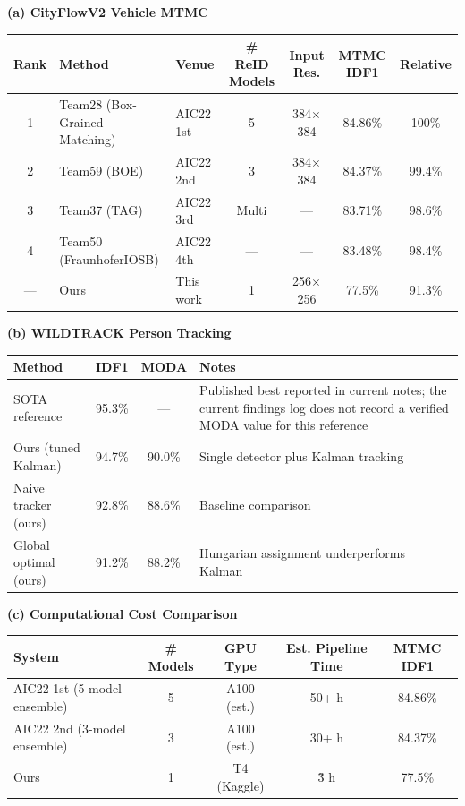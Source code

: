 \begingroup
\scriptsize
\setlength{\tabcolsep}{4pt}

\begin{minipage}{\textwidth}
\textbf{(a) CityFlowV2 Vehicle MTMC}

\begin{tabularx}{\textwidth}{c l l c c c c}
\toprule
Rank & Method & Venue & \# ReID Models & Input Res. & MTMC IDF1 & Relative \\
\midrule
1 & Team28 (Box-Grained Matching) & AIC22 1st & 5 & 384$\times$384 & 84.86\% & 100\% \\
2 & Team59 (BOE) & AIC22 2nd & 3 & 384$\times$384 & 84.37\% & 99.4\% \\
3 & Team37 (TAG) & AIC22 3rd & Multi & --- & 83.71\% & 98.6\% \\
4 & Team50 (FraunhoferIOSB) & AIC22 4th & --- & --- & 83.48\% & 98.4\% \\
--- & Ours & This work & 1 & 256$\times$256 & 77.5\% & 91.3\% \\
\bottomrule
\end{tabularx}
\end{minipage}

\vspace{0.7em}

\begin{minipage}{\textwidth}
\textbf{(b) WILDTRACK Person Tracking}

\begin{tabularx}{\textwidth}{l c c X}
\toprule
Method & IDF1 & MODA & Notes \\
\midrule
SOTA reference & 95.3\% & --- & Published best reported in current notes; the current findings log does not record a verified MODA value for this reference \\
Ours (tuned Kalman) & 94.7\% & 90.0\% & Single detector plus Kalman tracking \\
Naive tracker (ours) & 92.8\% & 88.6\% & Baseline comparison \\
Global optimal (ours) & 91.2\% & 88.2\% & Hungarian assignment underperforms Kalman \\
\bottomrule
\end{tabularx}
\end{minipage}

\vspace{0.7em}

\begin{minipage}{\textwidth}
\textbf{(c) Computational Cost Comparison}

\begin{tabularx}{\textwidth}{l c c c c}
\toprule
System & \# Models & GPU Type & Est. Pipeline Time & MTMC IDF1 \\
\midrule
AIC22 1st (5-model ensemble) & 5 & A100 (est.) & 50+ h & 84.86\% \\
AIC22 2nd (3-model ensemble) & 3 & A100 (est.) & 30+ h & 84.37\% \\
Ours & 1 & T4 (Kaggle) & \~3 h & 77.5\% \\
\bottomrule
\end{tabularx}
\end{minipage}

\endgroup